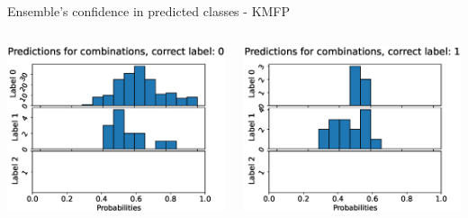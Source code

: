 \begin{frame}[fragile]{Ensemble's confidence in predicted classes - KMFP}
  \begin{columns}[T,onlytextwidth]
      \includegraphics[width=\textwidth]{files/figs/res/kmfp/pc0.eps}

      \includegraphics[width=\textwidth]{files/figs/res/kmfp/pc1.eps}


\end{columns}
\end{frame}
